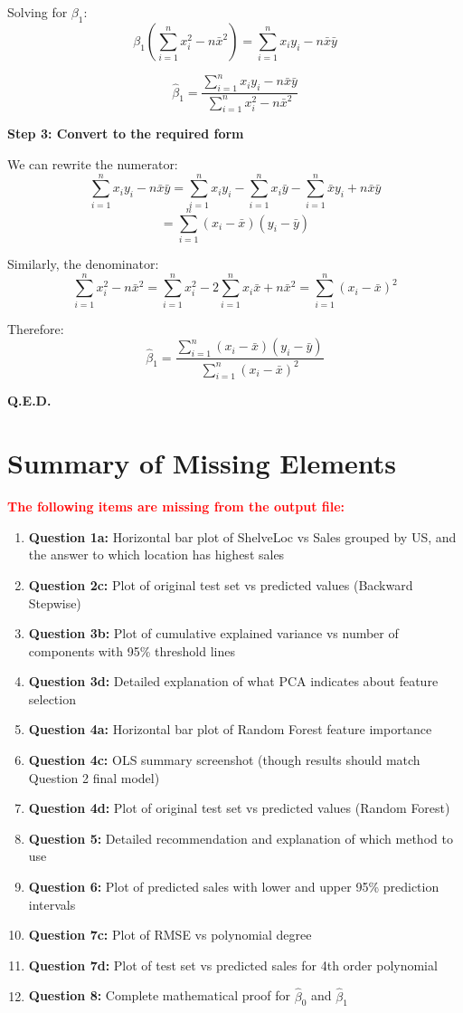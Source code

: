 \documentclass[11pt]{article}
\begin{document}
Solving for $\beta_1$:
\[
\beta_1\left(\sum_{i=1}^{n}x_i^2 - n\bar{x}^2\right) = \sum_{i=1}^{n}x_i y_i - n\bar{x}\bar{y}
\]

\[
\hat{\beta}_1 = \frac{\sum_{i=1}^{n}x_i y_i - n\bar{x}\bar{y}}{\sum_{i=1}^{n}x_i^2 - n\bar{x}^2}
\]

\textbf{Step 3: Convert to the required form}

We can rewrite the numerator:
\[
\sum_{i=1}^{n}x_i y_i - n\bar{x}\bar{y} = \sum_{i=1}^{n}x_i y_i - \sum_{i=1}^{n}x_i\bar{y} - \sum_{i=1}^{n}\bar{x}y_i + n\bar{x}\bar{y}
\]
\[
= \sum_{i=1}^{n}(x_i - \bar{x})(y_i - \bar{y})
\]

Similarly, the denominator:
\[
\sum_{i=1}^{n}x_i^2 - n\bar{x}^2 = \sum_{i=1}^{n}x_i^2 - 2\sum_{i=1}^{n}x_i\bar{x} + n\bar{x}^2 = \sum_{i=1}^{n}(x_i - \bar{x})^2
\]

Therefore:
\[
\hat{\beta}_1 = \frac{\sum_{i=1}^{n}(x_i - \bar{x})(y_i - \bar{y})}{\sum_{i=1}^{n}(x_i - \bar{x})^2}
\]

\textbf{Q.E.D.}

\section{Summary of Missing Elements}

\textcolor{red}{\textbf{The following items are missing from the output file:}}

\begin{enumerate}
    \item \textbf{Question 1a:} Horizontal bar plot of ShelveLoc vs Sales grouped by US, and the answer to which location has highest sales
    \item \textbf{Question 2c:} Plot of original test set vs predicted values (Backward Stepwise)
    \item \textbf{Question 3b:} Plot of cumulative explained variance vs number of components with 95\% threshold lines
    \item \textbf{Question 3d:} Detailed explanation of what PCA indicates about feature selection
    \item \textbf{Question 4a:} Horizontal bar plot of Random Forest feature importance
    \item \textbf{Question 4c:} OLS summary screenshot (though results should match Question 2 final model)
    \item \textbf{Question 4d:} Plot of original test set vs predicted values (Random Forest)
    \item \textbf{Question 5:} Detailed recommendation and explanation of which method to use
    \item \textbf{Question 6:} Plot of predicted sales with lower and upper 95\% prediction intervals
    \item \textbf{Question 7c:} Plot of RMSE vs polynomial degree
    \item \textbf{Question 7d:} Plot of test set vs predicted sales for 4th order polynomial
    \item \textbf{Question 8:} Complete mathematical proof for $\hat{\beta}_0$ and $\hat{\beta}_1$
\end{enumerate}
\end{document}
